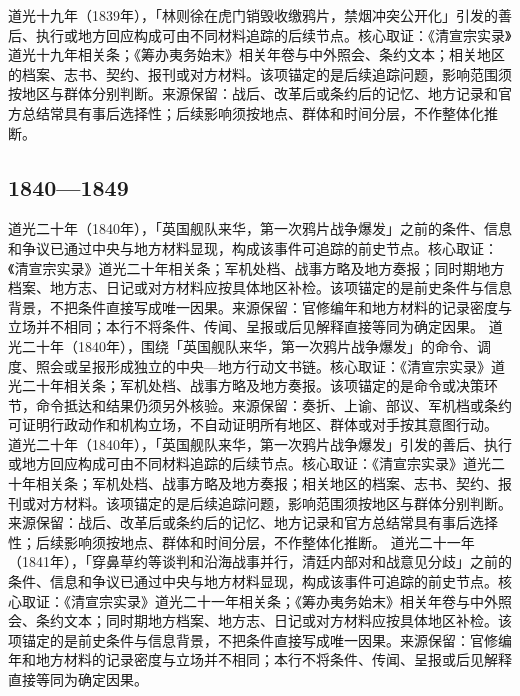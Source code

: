道光十九年（1839年），「林则徐在虎门销毁收缴鸦片，禁烟冲突公开化」引发的善后、执行或地方回应构成可由不同材料追踪的后续节点。核心取证：《清宣宗实录》道光十九年相关条；《筹办夷务始末》相关年卷与中外照会、条约文本；相关地区的档案、志书、契约、报刊或对方材料。该项锚定的是后续追踪问题，影响范围须按地区与群体分别判断。来源保留：战后、改革后或条约后的记忆、地方记录和官方总结常具有事后选择性；后续影响须按地点、群体和时间分层，不作整体化推断。
\subsection{1840—1849}
道光二十年（1840年），「英国舰队来华，第一次鸦片战争爆发」之前的条件、信息和争议已通过中央与地方材料显现，构成该事件可追踪的前史节点。核心取证：《清宣宗实录》道光二十年相关条；军机处档、战事方略及地方奏报；同时期地方档案、地方志、日记或对方材料应按具体地区补检。该项锚定的是前史条件与信息背景，不把条件直接写成唯一因果。来源保留：官修编年和地方材料的记录密度与立场并不相同；本行不将条件、传闻、呈报或后见解释直接等同为确定因果。
道光二十年（1840年），围绕「英国舰队来华，第一次鸦片战争爆发」的命令、调度、照会或呈报形成独立的中央—地方行动文书链。核心取证：《清宣宗实录》道光二十年相关条；军机处档、战事方略及地方奏报。该项锚定的是命令或决策环节，命令抵达和结果仍须另外核验。来源保留：奏折、上谕、部议、军机档或条约可证明行政动作和机构立场，不自动证明所有地区、群体或对手按其意图行动。
道光二十年（1840年），「英国舰队来华，第一次鸦片战争爆发」引发的善后、执行或地方回应构成可由不同材料追踪的后续节点。核心取证：《清宣宗实录》道光二十年相关条；军机处档、战事方略及地方奏报；相关地区的档案、志书、契约、报刊或对方材料。该项锚定的是后续追踪问题，影响范围须按地区与群体分别判断。来源保留：战后、改革后或条约后的记忆、地方记录和官方总结常具有事后选择性；后续影响须按地点、群体和时间分层，不作整体化推断。
道光二十一年（1841年），「穿鼻草约等谈判和沿海战事并行，清廷内部对和战意见分歧」之前的条件、信息和争议已通过中央与地方材料显现，构成该事件可追踪的前史节点。核心取证：《清宣宗实录》道光二十一年相关条；《筹办夷务始末》相关年卷与中外照会、条约文本；同时期地方档案、地方志、日记或对方材料应按具体地区补检。该项锚定的是前史条件与信息背景，不把条件直接写成唯一因果。来源保留：官修编年和地方材料的记录密度与立场并不相同；本行不将条件、传闻、呈报或后见解释直接等同为确定因果。
